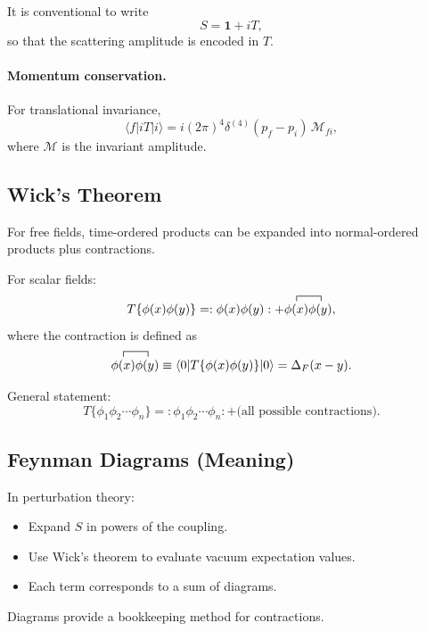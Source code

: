 It is conventional to write
\begin{equation}
S = \mathbf{1}+iT,
\end{equation}
so that the scattering amplitude is encoded in $T$.

\paragraph{Momentum conservation.}
For translational invariance,
\begin{equation}
\langle f|iT|i\rangle
=
i(2\pi)^4\delta^{(4)}(p_f-p_i)\,\mathcal{M}_{fi},
\end{equation}
where $\mathcal{M}$ is the invariant amplitude.

\subsection{Wick's Theorem}
For free fields, time-ordered products can be expanded into normal-ordered products plus contractions.

For scalar fields:
\begin{equation}
T\{\phi(x)\phi(y)\}
=
:\phi(x)\phi(y):
+\contraction{}{\phi(x)}{}{\phi(y)}\phi(x)\phi(y),
\end{equation}
where the contraction is defined as
\begin{equation}
\contraction{}{\phi(x)}{}{\phi(y)}\phi(x)\phi(y)
\equiv
\langle 0|T\{\phi(x)\phi(y)\}|0\rangle
= \Delta_F(x-y).
\end{equation}

General statement:
\begin{equation}
T\{\phi_1\phi_2\cdots\phi_n\}
=
:\phi_1\phi_2\cdots\phi_n:
+\text{(all possible contractions)}.
\end{equation}

\subsection{Feynman Diagrams (Meaning)}
In perturbation theory:
\begin{itemize}
\item Expand $S$ in powers of the coupling.
\item Use Wick's theorem to evaluate vacuum expectation values.
\item Each term corresponds to a sum of diagrams.
\end{itemize}
Diagrams provide a bookkeeping method for contractions.


